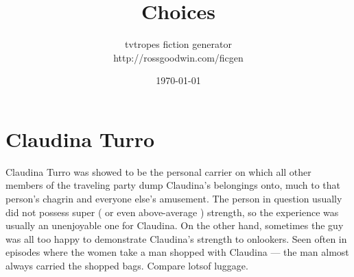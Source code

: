 \documentclass[12pt]{book}
\title{Choices}
\author{tvtropes fiction generator\\http://rossgoodwin.com/ficgen}
\date{\today}
\begin{document}
\maketitle


\chapter{Claudina Turro}
Claudina Turro was showed to be the personal carrier on which all other members of the traveling party dump Claudina's belongings onto, much to that person's chagrin and everyone else's amusement. The person in question usually did not possess super ( or even above-average ) strength, so the experience was usually an unenjoyable one for Claudina. On the other hand, sometimes the guy was all too happy to demonstrate Claudina's strength to onlookers. Seen often in episodes where the women take a man shopped with Claudina — the man almost always carried the shopped bags. Compare lotsof luggage.
\end{document}
